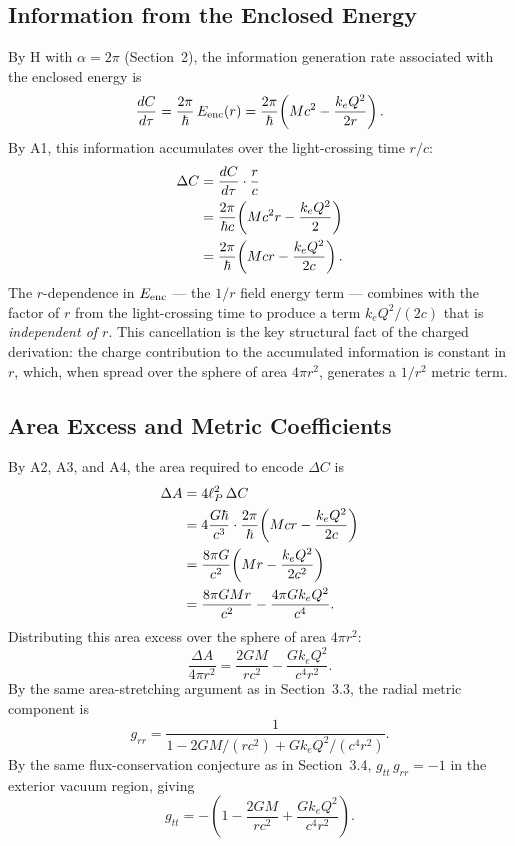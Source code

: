 \documentclass[12pt]{article}
\begin{document}
\subsection{Information from the Enclosed Energy}
\label{sec:rn-info}

By H with $\alpha = 2\pi$ (Section~2), the information generation rate
associated with the enclosed energy is
\begin{equation}
  \frac{dC}{d\tau}
    = \frac{2\pi}{\hbar}\,E_{\rm enc}(r)
    = \frac{2\pi}{\hbar}\!\left(Mc^2 - \frac{k_e Q^2}{2r}\right).
  \label{eq:rn-rate}
\end{equation}
By A1, this information accumulates over the light-crossing time $r/c$:
\begin{align}
  \Delta C
    &= \frac{dC}{d\tau}\cdot\frac{r}{c} \notag \\
    &= \frac{2\pi}{\hbar c}\!\left(Mc^2 r - \frac{k_e Q^2}{2}\right) \notag \\
    &= \frac{2\pi}{\hbar}\!\left(Mcr - \frac{k_e Q^2}{2c}\right).
  \label{eq:rn-transit}
\end{align}
The $r$-dependence in $E_{\rm enc}$ --- the $1/r$ field energy term ---
combines with the factor of $r$ from the light-crossing time to produce
a term $k_e Q^2/(2c)$ that is \emph{independent of $r$}.
This cancellation is the key structural fact of the charged derivation:
the charge contribution to the accumulated information is constant in
$r$, which, when spread over the sphere of area $4\pi r^2$, generates
a $1/r^2$ metric term.

\subsection{Area Excess and Metric Coefficients}
\label{sec:rn-area}

By A2, A3, and A4, the area required to encode $\Delta C$ is
\begin{align}
  \Delta A
    &= 4\ell_P^2\,\Delta C \notag \\
    &= 4\frac{G\hbar}{c^3}\cdot\frac{2\pi}{\hbar}
       \!\left(Mcr - \frac{k_e Q^2}{2c}\right) \notag \\
    &= \frac{8\pi G}{c^2}\!\left(Mr - \frac{k_e Q^2}{2c^2}\right) \notag \\
    &= \frac{8\pi GMr}{c^2} - \frac{4\pi G k_e Q^2}{c^4}.
  \label{eq:rn-area}
\end{align}
Distributing this area excess over the sphere of area $4\pi r^2$:
\begin{equation}
  \frac{\Delta A}{4\pi r^2}
    = \frac{2GM}{rc^2} - \frac{G k_e Q^2}{c^4 r^2}.
  \label{eq:rn-ratio}
\end{equation}
By the same area-stretching argument as in Section~3.3, the radial
metric component is
\begin{equation}
  g_{rr} = \frac{1}{1 - 2GM/(rc^2) + G k_e Q^2/(c^4 r^2)}.
  \label{eq:rn-grr}
\end{equation}
By the same flux-conservation conjecture as in Section~3.4,
$g_{tt}\,g_{rr} = -1$ in the exterior vacuum region, giving
\begin{equation}
  g_{tt} = -\!\left(1 - \frac{2GM}{rc^2} + \frac{G k_e Q^2}{c^4 r^2}\right).
  \label{eq:rn-gtt}
\end{equation}
\end{document}

